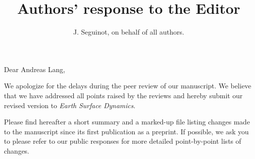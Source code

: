 


\title{Authors' response to the Editor}
\author{J. Seguinot, on behalf of all authors.}


\thispagestyle{empty}
\maketitle
\bigskip

    Dear Andreas Lang,

    We apologize for the delays during the peer review of our manuscript. We
    believe that we have addressed all points raised by the reviews and hereby
    submit our revised version to \emph{Earth Surface Dynamics}.

    Please find hereafter a short summary and a marked-up file listing changes
    made to the manuscript since its first publication as a preprint. If
    possible, we ask you to please refer to our public responses for more
    detailed point-by-point lists of changes.


